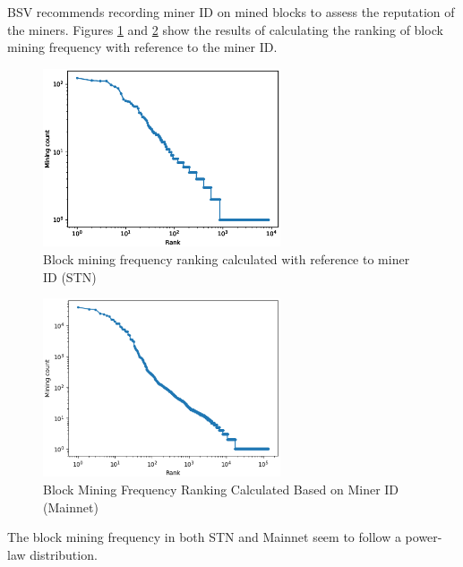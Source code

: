 \documentclass[graybox]{svmult}
\begin{document}
BSV recommends recording miner ID on mined blocks to assess the reputation of the miners.
Figures \ref{fig:minerrank_stn} and \ref{fig:minerrank_mainnet} show the results of calculating the ranking of block mining frequency with reference to the miner ID.
%
\begin{figure}[t]
  \vspace{-35mm}
  \begin{center}
    \includegraphics[width=70mm]{bsv_stn-block_miners-ranking-loglog.eps}
  \end{center}
  \vspace{35mm}
  \caption{Block mining frequency ranking calculated with reference to miner ID (STN)}
  \label{fig:minerrank_stn}
\end{figure}
%
%
\begin{figure}[t]
  \begin{center}
    \includegraphics[width=70mm]{bsv_mainnet-block_miners-ranking-loglog.eps}
  \end{center}
  \caption{Block Mining Frequency Ranking Calculated Based on Miner ID (Mainnet)}
  \label{fig:minerrank_mainnet}
\end{figure}
%
The block mining frequency in both STN and Mainnet seem to follow a power-law distribution.
\end{document}

